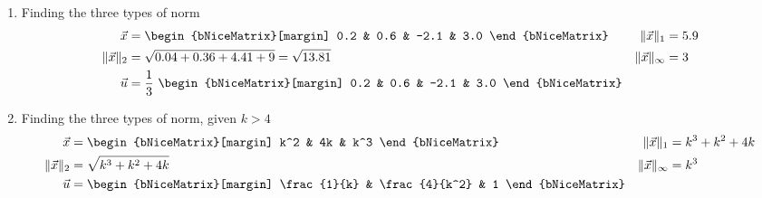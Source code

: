 \begin{enumerate}
    \item Finding the three types of norm
          \begin{align}
              \vec{x}                      & = \begin{bNiceMatrix}[margin]
                                                   0.2 & 0.6 & -2.1 & 3.0
                                               \end{bNiceMatrix}   &
              \lVert \vec{x} \rVert_1      & = 5.9                           \\
              \lVert \vec{x} \rVert_2      & = \sqrt{0.04 + 0.36 + 4.41 + 9}
              = \sqrt{13.81}               &
              \lVert \vec{x} \rVert_\infty & = 3                             \\
              \vec{u}                      & = \frac{1}{3}
              \ \begin{bNiceMatrix}[margin]
                    0.2 & 0.6 & -2.1 & 3.0
                \end{bNiceMatrix}
          \end{align}

    \item Finding the three types of norm, given $ k > 4 $
          \begin{align}
              \vec{x}                      & = \begin{bNiceMatrix}[margin]
                                                   k^2 & 4k & k^3
                                               \end{bNiceMatrix}    &
              \lVert \vec{x} \rVert_1      & = k^3 + k^2 + 4k                   \\
              \lVert \vec{x} \rVert_2      & = \sqrt{k^3 + k^2 + 4k}          &
              \lVert \vec{x} \rVert_\infty & = k^3                              \\
              \vec{u}                      & = \begin{bNiceMatrix}[margin]
                                                   \frac{1}{k} & \frac{4}{k^2} & 1
                                               \end{bNiceMatrix}
          \end{align}


\end{enumerate}
